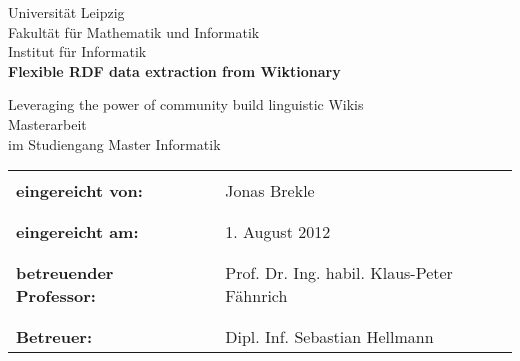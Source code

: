 \documentclass[a4paper]{scrartcl}
\newcommand{\NAME}{Flexible RDF data extraction from Wiktionary}
\newcommand{\TITLE}{\NAME}
\newcommand{\TITLER}{Leveraging the power of community build linguistic Wikis}
\begin{document}
\begin{titlepage}
\vspace{2 cm}
\thispagestyle{empty}
\begin{center}
\Large{
Universität Leipzig\\
Fakultät für Mathematik und Informatik\\
Institut für Informatik\\
}
\vspace{3 cm}
\textbf{
	\Large{
	\TITLE\\
	}
}

\TITLER\\
\vspace{2 cm}
Masterarbeit\\
im Studiengang Master Informatik

\end{center}
\vspace{6 cm}

\begin{flushleft}
\begin{tabular}{lll}
& & \\
\textbf{eingereicht von:} & & Jonas Brekle\\
& & \\
& & \\
\textbf{eingereicht am:} & & 1. August 2012\\
& & \\
& & \\
\textbf{betreuender Professor:} & & Prof. Dr. Ing. habil. Klaus-Peter Fähnrich\\
& & \\
& & \\
\textbf{Betreuer:} & & Dipl. Inf. Sebastian Hellmann
\end{tabular}
\end{flushleft}
\end{titlepage}
\end{document}
